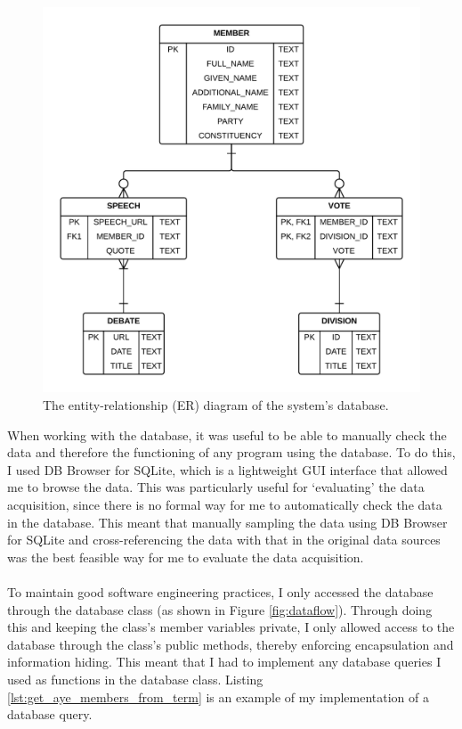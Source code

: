 \documentclass[12pt,a4paper,twoside,openright]{report}
\newcommand{\mylisting}[4]{}
\newcommand{\pylisting}[2]{\mylisting{Python}{py}{#1}{#2}}
\begin{document}
\begin{figure}
	\includegraphics[width=\linewidth]{figs/erd.png}
	\caption{The entity-relationship (ER) diagram of the system's database.}
	\label{fig:erdiagram}
\end{figure}
When working with the database, it was useful to be able to manually check the data and therefore the functioning of any program using the database. To do this, I used DB Browser for SQLite, which is a lightweight GUI interface that allowed me to browse the data. This was particularly useful for `evaluating' the data acquisition, since there is no formal way for me to automatically check the data in the database. This meant that manually sampling the data using DB Browser for SQLite and cross-referencing the data with that in the original data sources was the best feasible way for me to evaluate the data acquisition.
\\\\
To maintain good software engineering practices, I only accessed the database through the database class (as shown in Figure \ref{fig:dataflow}). Through doing this and keeping the class's member variables private, I only allowed access to the database through the class's public methods, thereby enforcing encapsulation and information hiding. This meant that I had to implement any database queries I used as functions in the database class. Listing \ref{lst:get_aye_members_from_term} is an example of my implementation of a database query.
\\\\
\pylisting{Function that performs a query on the database to get the ids of all the MPs who voted `aye' in a given vote and spoke in a debate whose title contains a given term.}{get_aye_members_from_term}
\end{document}
